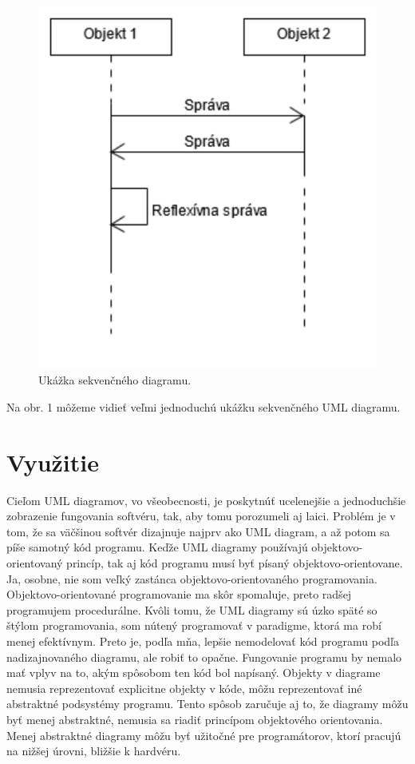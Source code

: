 \documentclass[10pt,twoside,slovak,a4paper]{article}
\begin{document}
\begin{figure}[tbh]
\centering
\includegraphics[scale=0.7]{seq_diagram.pdf}
\caption{Ukážka sekvenčného diagramu.}
\end{figure}

\noindent Na obr. 1 môžeme vidieť veľmi jednoduchú ukážku sekvenčného UML diagramu.

\section{Využitie}
Cieľom UML diagramov, vo všeobecnosti, je poskytnúť ucelenejšie a jednoduchšie zobrazenie fungovania softvéru, tak, aby tomu porozumeli aj laici. 
Problém je v tom, že sa väčšinou softvér dizajnuje najprv ako UML diagram, a až potom sa píše samotný kód programu. Keďže UML diagramy používajú objektovo-orientovaný princíp, tak aj kód programu musí byť písaný objektovo-orientovane. \cite{eriksson98}
Ja, osobne, nie som veľký zastánca objektovo-orientovaného programovania. Objektovo-orientované programovanie ma skôr spomaluje, preto radšej programujem procedurálne. Kvôli tomu, že UML diagramy sú úzko späté so štýlom programovania, som nútený programovať v paradigme, ktorá 
ma robí menej efektívnym. Preto je, podľa mňa, lepšie nemodelovať kód programu podľa nadizajnovaného diagramu, ale robiť to opačne. Fungovanie programu by nemalo mať vplyv na to, akým spôsobom ten kód bol napísaný. Objekty v diagrame nemusia reprezentovať explicitne objekty v kóde, môžu reprezentovať 
iné abstraktné podsystémy programu. Tento spôsob zaručuje aj to, že diagramy môžu byť menej abstraktné, nemusia sa riadiť princípom objektového orientovania. Menej abstraktné diagramy môžu byť užitočné pre programátorov, ktorí pracujú na nižšej úrovni, bližšie k hardvéru. \newline 
\end{document}

